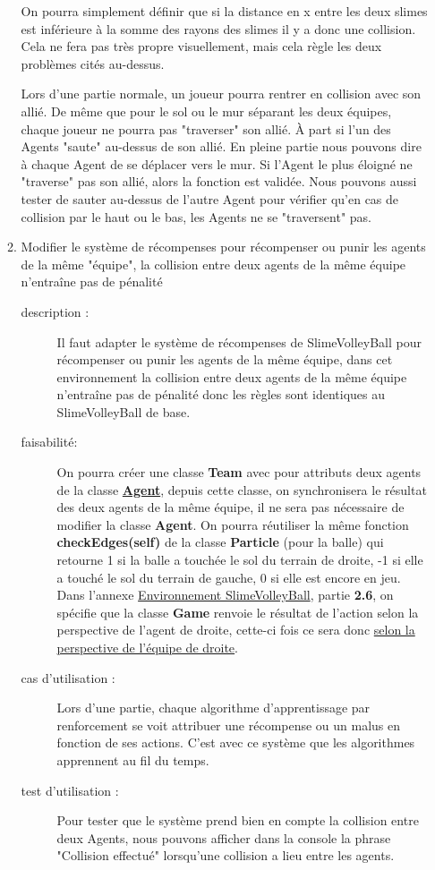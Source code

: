\documentclass[11pt, a4paper]{article}
\newcommand{\besoinVItem}[5]{
	\item #1
	\begin{description}
		\item[description :]
		#2 
		\item[faisabilité: ]
		#3
		\item[cas d'utilisation :]
		#4
		\item[test d'utilisation :]      
		#5
	\end{description}
}
\begin{document}
\begin{itemize}
\begin{enumerate}
{	}
	{
		On pourra simplement définir que si la distance en x entre les deux slimes est inférieure à la somme des rayons des slimes il y a donc une collision. 
		Cela ne fera pas très propre visuellement, mais cela règle les deux problèmes cités au-dessus.

	}
	{
        Lors d'une partie normale, un joueur pourra rentrer en collision avec son allié. De même que pour le sol ou le mur séparant les deux équipes, chaque joueur ne pourra pas "traverser" son allié.  À part si l'un des Agents "saute" au-dessus de son allié.
	}
	{
        En pleine partie nous pouvons dire à chaque Agent de se déplacer vers le mur. Si l'Agent le plus éloigné ne "traverse" pas son allié, alors la fonction est validée.
		Nous pouvons aussi tester de sauter au-dessus de l'autre Agent pour vérifier qu'en cas de collision par le haut ou le bas, les Agents ne se "traversent" pas.
	} 

	\besoinVItem{Modifier le système de récompenses pour récompenser ou punir les agents de la même "équipe", la collision entre deux agents de la même équipe n'entraîne pas de pénalité}
	{ 
  		Il faut adapter le système de récompenses de SlimeVolleyBall pour récompenser ou punir les agents de la même équipe, dans cet environnement la collision entre deux agents de la même équipe 
		  n'entraîne pas de pénalité donc les règles sont identiques au SlimeVolleyBall de base.
	}
	{
		On pourra créer une classe \textbf{Team} avec pour attributs deux agents de la classe \hyperlink{link2}{\textbf{Agent}}, depuis cette classe, on synchronisera le résultat des deux agents de la même équipe, il ne sera pas 
		nécessaire de modifier la classe \textbf{Agent}. On pourra réutiliser la même fonction \textbf{checkEdges(self)} de la classe \textbf{Particle} (pour la balle) qui retourne 1 si la balle a touchée le sol du terrain de droite, 
		-1 si elle a touché le sol du terrain de gauche, 0 si elle est encore en jeu. Dans l'annexe \href{/annexes/Environnement_SlimeVolleyBall.pdf}{Environnement SlimeVolleyBall}, partie \textbf{2.6}, on spécifie 
		que la classe \textbf{Game} renvoie le résultat de l'action selon la perspective de l'agent de droite, cette-ci fois ce sera donc \underline{selon la perspective de l'équipe de droite}. \\
  
	}
	{
        Lors d'une partie, chaque algorithme d'apprentissage par renforcement se voit attribuer une récompense ou un malus en fonction de ses actions. C'est avec ce système que les algorithmes apprennent au fil du temps. 
	}
	{
        Pour tester que le système prend bien en compte la collision entre deux Agents, nous pouvons afficher dans la console la phrase "Collision effectué" lorsqu'une collision a lieu entre les agents.
	} 


\end{enumerate}
\end{itemize}
\end{document}
